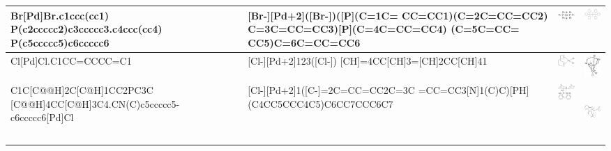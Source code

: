\begin{landscape}
\begin{longtable}{m{7cm}m{8cm}m{2.3cm}m{2.3cm}}
 Br[Pd]Br.c1ccc(cc1) P(c2ccccc2)c3ccccc3.c4ccc(cc4) P(c5ccccc5)c6ccccc6 & 
 [Br-][Pd+2]([Br-])([P](C=1C= CC=CC1)(C=2C=CC=CC2) C=3C=CC=CC3)[P](C=4C=CC=CC4) (C=5C=CC= CC5)C=6C=CC=CC6 & 
 \includegraphics[width=2.2cm]{imagenes/sigmaAldrich/trans-Dibromobis(triphenylphosphine)palladium(II).png} & 
 \includegraphics[width=2.2cm]{imagenes/sciFinder/pdf/trans-Dibromobis(triphenylphosphine)palladium(II).pdf} \\
\hline

 Cl[Pd]Cl.C1CC=CCCC=C1 & 
 [Cl-][Pd+2]123([Cl-]) [CH]=4CC[CH]3=[CH]2CC[CH]41 & 
 \includegraphics[width=2.2cm]{imagenes/sigmaAldrich/Dichloro(1,5-cyclooctadiene)palladium(II).png} & 
 \includegraphics[width=2.2cm]{imagenes/sciFinder/pdf/Dichloro(1,5-cyclooctadiene)palladium(II).pdf} \\
\hline

 C1C[C@@H]2C[C@H]1CC2PC3C [C@@H]4CC[C@H]3C4.CN(C)c5ccccc5-c6ccccc6[Pd]Cl & 
 [Cl-][Pd+2]1([C-]=2C=CC=CC2C=3C =CC=CC3[N]1(C)C)[PH] (C4CC5CCC4C5)C6CC7CCC6C7 & 
 \includegraphics[width=2.1cm]{imagenes/sigmaAldrich/SK-CC 01A.jpeg} & 
 \includegraphics[width=2.2cm, height=2.1cm]{imagenes/sciFinder/pdf/SK-CC 01A.pdf} \\
\hline


\end{longtable}
\end{landscape}
